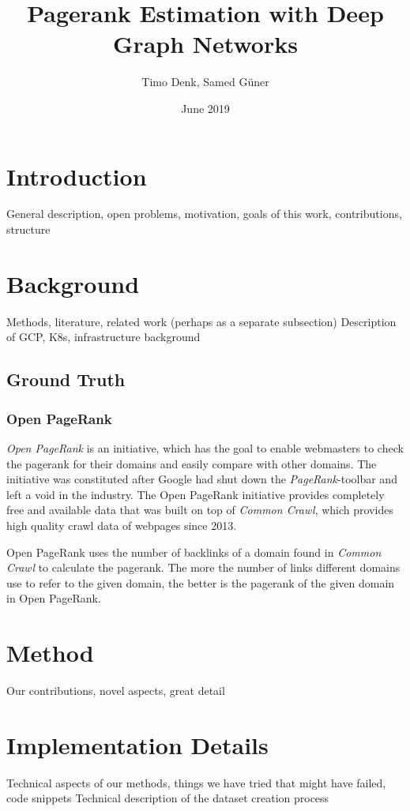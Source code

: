 \documentclass{article}
\title{Pagerank Estimation with Deep Graph Networks}
\author{Timo Denk, Samed Güner}
\date{June 2019}
\begin{document}
\maketitle

\section{Introduction}
General description, open problems, motivation, goals of this work, contributions, structure

\section{Background}
Methods, literature, related work (perhaps as a separate subsection)
Description of GCP, K8s, infrastructure background

\subsection{Ground Truth}
\subsubsection{Open PageRank}
\label{OpenPageRank}
\textit{Open PageRank} is an initiative, which has the goal to enable webmasters to check the pagerank for their domains and easily compare with other domains. The initiative was constituted after Google had shut down the \textit{PageRank}-toolbar and left a void in the industry. The Open PageRank initiative provides completely free and available data that was built on top of \textit{Common Crawl}, which provides high quality crawl data of webpages since 2013. \cite{OpenPageRank} \cite{CommonCrawl}

Open PageRank uses the number of backlinks of a domain found in \textit{Common Crawl} to calculate the pagerank. The more the number of links different domains use to refer to the given domain, the better is the pagerank of the given domain in Open PageRank.


\section{Method}
Our contributions, novel aspects, great detail



\section{Implementation Details}
Technical aspects of our methods, things we have tried that might have failed, code snippets
Technical description of the dataset creation process
\end{document}

